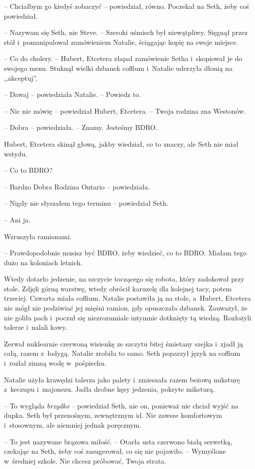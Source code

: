 \documentclass[oneside,polish,11pt,sfheadings]{mwbk}
\begin{document}
-- Chciałbym go kiedyś zobaczyć -- powiedział, równo. Poczekał na Seth, żeby coś powiedział.

-- Nazywam się Seth, nie Steve. -- Szeroki uśmiech był niewątpliwy.
Sięgnął przez stół i~pomanipulował zamówieniem Natalie, ściągając kopię
na swoje miejsce.

-- Co do cholery. -- Hubert, Etcetera złapał zamówienie Setha i~skopiował
je do swojego menu. Stuknął wielki dzbanek coffium i~Natalie uderzyła
dłonią na ,,akceptuj''.

-- Dawaj -- powiedziała Natalie. -- Powiedz to.

-- Nic nie mówię -- powiedział Hubert, Etcetera. -- Twoja rodzina zna
Westonów.

-- Dobra -- powiedziała. -- Znamy. Jesteśmy BDRO.

Hubert, Etcetera skinął głową, jakby wiedział, co to znaczy, ale Seth
nie miał wstydu. 

-- Co to BDRO?

-- Bardzo Dobra Rodzina Ontario -- powiedziała.

-- Nigdy nie słyszałem tego terminu -- powiedział Seth.

-- Ani ja.

Wzruszyła ramionami. 

-- Prawdopodobnie musisz być BDRO, żeby wiedzieć, co
to BDRO. Miałam tego dużo na koloniach letnich.

Wtedy dotarło jedzenie, na szczycie toczącego się robota, który
zadokował przy stole. Zdjęli górną warstwę, wtedy obrócił karuzelę dla
kolejnej tacy, potem trzeciej. Czwarta miała coffium. Natalie postawiła
ją na stole, a~Hubert, Etcetera nie mógł nie podziwiać jej mięśni
ramion, gdy opuszczała dzbanek. Zauważył, że nie goliła pach i~poczuł
się niezrozumiale intymnie dotknięty tą wiedzą. Rozłożyli talerze i~nalali kawy.

Zerwał nuklearnie czerwoną wisienkę ze szczytu bitej śmietany szejka i~zjadł ją całą, razem z~łodygą. Natalie zrobiła to samo. Seth poparzył
język na coffium i~rozlał zimną wodę w~pośpiechu.

Natalie użyła krawędzi talerza jako palety i~zmieszała razem beżową
miksturę z~keczupu i~majonezu. Jadła drobne kęsy jedzenia, pokryte
miksturą.

-- To wygląda \textit{brzydko} -- powiedział Seth, nie on, ponieważ nie
chciał wyjść na dupka. Seth był przenośnym, zewnętrznym id. Nie zawsze
komfortowym i~stosownym, ale niemniej jednak poręcznym.

-- To jest nazywane brązowa miłość. -- Otarła usta czerwono \dywiz białą
serwetką, czekając na Seth, żeby coś zasugerował, co się nie pojawiło. -- Wymyślone w~średniej szkole. Nie chcesz próbować, Twoja strata. 
\end{document}
